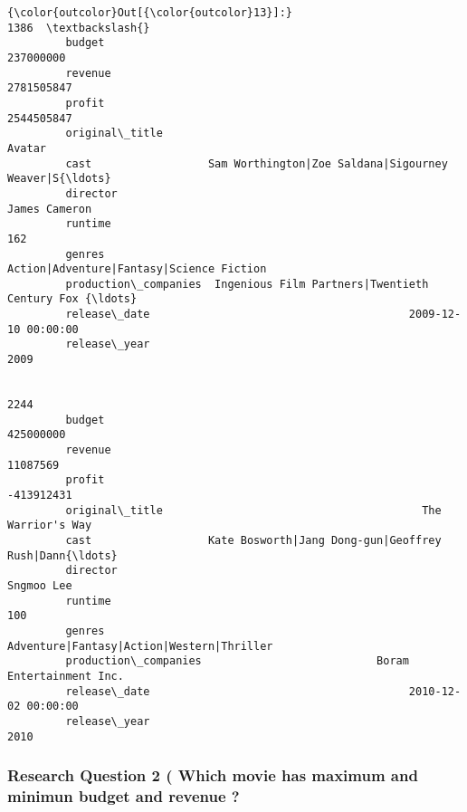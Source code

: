 \documentclass[11pt]{article}
\begin{document}
\begin{Verbatim}[commandchars=\\\{\}]
{\color{outcolor}Out[{\color{outcolor}13}]:}                                                                    1386  \textbackslash{}
         budget                                                        237000000   
         revenue                                                      2781505847   
         profit                                                       2544505847   
         original\_title                                                   Avatar   
         cast                  Sam Worthington|Zoe Saldana|Sigourney Weaver|S{\ldots}   
         director                                                  James Cameron   
         runtime                                                             162   
         genres                         Action|Adventure|Fantasy|Science Fiction   
         production\_companies  Ingenious Film Partners|Twentieth Century Fox {\ldots}   
         release\_date                                        2009-12-10 00:00:00   
         release\_year                                                       2009   
         
                                                                            2244  
         budget                                                        425000000  
         revenue                                                        11087569  
         profit                                                       -413912431  
         original\_title                                        The Warrior's Way  
         cast                  Kate Bosworth|Jang Dong-gun|Geoffrey Rush|Dann{\ldots}  
         director                                                     Sngmoo Lee  
         runtime                                                             100  
         genres                        Adventure|Fantasy|Action|Western|Thriller  
         production\_companies                           Boram Entertainment Inc.  
         release\_date                                        2010-12-02 00:00:00  
         release\_year                                                       2010  
\end{Verbatim}
            
    \subsubsection{Research Question 2 ( Which movie has maximum and minimun
budget and revenue
?}\label{research-question-2-which-movie-has-maximum-and-minimun-budget-and-revenue}
\end{document}
